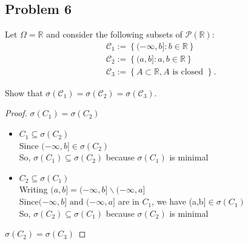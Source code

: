 \documentclass[letterpaper, 11pt]{article}
\newcommand{\1}{\mathds{1}}	%
\theoremstyle{definition}
\begin{document}
\subsection*{Problem 6}
Let $\Omega = \mathbb{R}$ and consider the following subsets of $\mathcal{P}(\mathbb{R})$:
$$\begin{aligned}
& \mathcal{C}_1 := \left\{( -\infty, b] : b \in \mathbb{R} \right\} \\
& \mathcal{C}_2 := \left\{( a, b] : a, b \in \mathbb{R} \right\} \\
& \mathcal{C}_3 := \left\{ A \subset \mathbb{R}, A \text{ is closed } \right\}.
\end{aligned}$$

Show that $\sigma(\mathcal{C}_1) = \sigma(\mathcal{C}_2) = \sigma(\mathcal{C}_3)$.
\begin{proof}
    $ \sigma(C_1)=\sigma(C_2) $ 
    \begin{itemize}
    \item $ C_1\subseteq \sigma(C_2) $ \\Since $(-\infty,b]\in \sigma(C_2)$\\So, $\sigma(C_1)\subseteq\sigma(C_2)$ because $ \sigma(C_1) $ is minimal
    \item $ C_2\subseteq \sigma(C_1) $ 
    \\Writing $ (a,b]=(-\infty,b]\backslash(-\infty ,a]$ \\Since$  (-\infty,b]\text{ and }(-\infty ,a] $ are in $ C_1 $, we have (a,b]$\in \sigma(C_1) $\\So, $ \sigma(C_2)\subseteq\sigma(C_1)$ because $ \sigma(C_2) $ is minimal 
    \end{itemize}
    $ \sigma(C_2)=\sigma(C_3) $ 
      

\end{proof}
\end{document}
